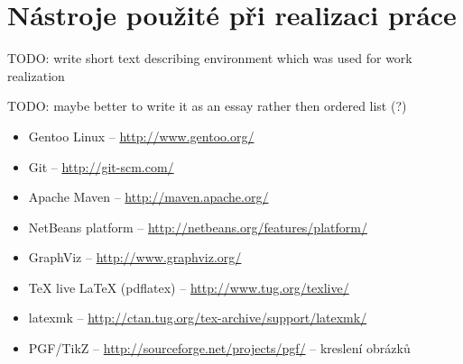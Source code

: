 \chapter{Nástroje použité při realizaci práce}
\noindent
TODO: write short text describing environment which was used for work realization

\noindent
TODO: maybe better to write it as an essay rather then ordered list (?)

\begin{itemize}
\item Gentoo Linux -- \href{http://www.gentoo.org/}{http://www.gentoo.org/}
\item Git -- \href{http://git-scm.com/}{http://git-scm.com/}
\item Apache Maven -- \href{http://maven.apache.org/}{http://maven.apache.org/}
\item NetBeans platform -- \href{http://netbeans.org/features/platform/}{http://netbeans.org/features/platform/}
\item GraphViz -- \href{http://www.graphviz.org/}{http://www.graphviz.org/}
\item TeX live \LaTeX{} (pdflatex) -- \href{http://www.tug.org/texlive/}{http://www.tug.org/texlive/}
\item latexmk -- \href{http://ctan.tug.org/tex-archive/support/latexmk/}{http://ctan.tug.org/tex-archive/support/latexmk/}
\item PGF/TikZ -- \href{http://sourceforge.net/projects/pgf/}{http://sourceforge.net/projects/pgf/} -- kreslení obrázků
\end{itemize}
